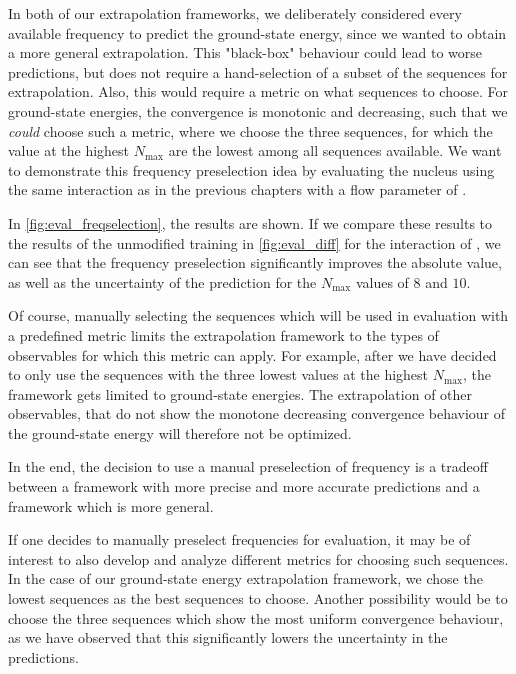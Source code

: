 In both of our extrapolation frameworks, we deliberately considered every available frequency to predict the ground-state energy, since we wanted to obtain a more general extrapolation. This "black-box" behaviour could lead to worse predictions, but does not require a hand-selection of a subset of the sequences for extrapolation. Also, this would require a metric on what sequences to choose. For ground-state energies, the convergence is monotonic and decreasing, such that we \textit{could} choose such a metric, where we choose the three sequences, for which the value at the highest $N_\mathrm{max}$ are the lowest among all sequences available. We want to demonstrate this frequency preselection idea by evaluating the  nucleus using the same interaction as in the previous chapters with a flow parameter of .

In \autoref{fig:eval_freqselection}, the results are shown. If we compare these results to the results of the unmodified training in \autoref{fig:eval_diff} for the  interaction of , we can see that the frequency preselection significantly improves the absolute value, as well as the uncertainty of the prediction for the $N_\mathrm{max}$ values of $8$ and $10$.

Of course, manually selecting the sequences which will be used in evaluation with a predefined metric limits the extrapolation framework to the types of observables for which this metric can apply. For example, after we have decided to only use the sequences with the three lowest values at the highest $N_\mathrm{max}$, the framework gets limited to ground-state energies. The extrapolation of other observables, that do not show the monotone decreasing convergence behaviour of the ground-state energy will therefore not be optimized.

In the end, the decision to use a manual preselection of frequency is a tradeoff between a framework with more precise and more accurate predictions and a framework which is more general.

If one decides to manually preselect frequencies for evaluation, it may be of interest to also develop and analyze different metrics for choosing such sequences. In the case of our ground-state energy extrapolation framework, we chose the lowest sequences as the best sequences to choose. Another possibility would be to choose the three sequences which show the most uniform convergence behaviour, as we have observed that this significantly lowers the uncertainty in the predictions.

